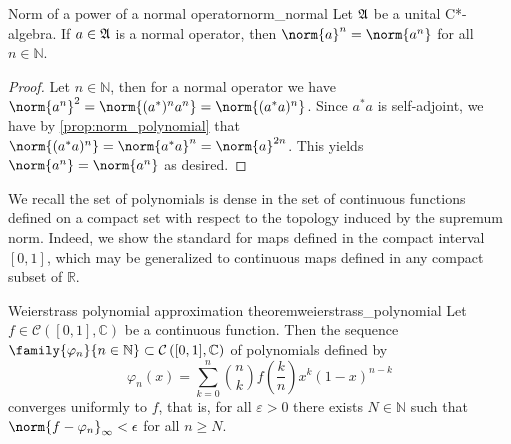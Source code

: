 \begin{proposition}{Norm of a power of a normal operator}{norm_normal}
    Let \(\mathfrak{A}\) be a unital C*-algebra. If \(a \in \mathfrak{A}\) is a normal operator, then \(\norm{a}^n = \norm{a^n}\) for all \(n \in \mathbb{N}\).
\end{proposition}
\begin{proof}
    Let \(n \in \mathbb{N}\), then for a normal operator we have \(\norm{a^n}^2 = \norm{(a^*)^n a^n} = \norm{(a^*a)^n}\). Since \(a^*a\) is self-adjoint, we have by \cref{prop:norm_polynomial} that \(\norm{(a^*a)^n} = \norm{a^*a}^n = \norm{a}^{2n}\). This yields \(\norm{a^n} = \norm{a^n}\) as desired.
\end{proof}

We recall the set of polynomials is dense in the set of continuous functions defined on a compact set with respect to the topology induced by the supremum norm. Indeed, we show the standard  for maps defined in the compact interval \([0,1]\), which may be generalized to continuous maps defined in any compact subset of \(\mathbb{R}\).
\begin{theorem}{Weierstrass polynomial approximation theorem}{weierstrass_polynomial}
    Let \(f \in \mathcal{C}\left([0,1], \mathbb{C}\right)\) be a continuous function. Then the sequence \(\family{\varphi_n}{n \in \mathbb{N}}\subset\mathcal{C}\left([0,1], \mathbb{C}\right)\) of polynomials defined by
    \begin{equation*}
        \varphi_n(x) = \sum_{k = 0}^n \binom{n}{k} f\left(\frac{k}{n}\right) x^k (1 - x)^{n - k}
    \end{equation*}
    converges uniformly to \(f\), that is, for all \(\varepsilon > 0\) there exists \(N \in \mathbb{N}\) such that \(\norm{f - \varphi_n}_\infty < \epsilon\) for all \(n \geq N\).
\end{theorem}
